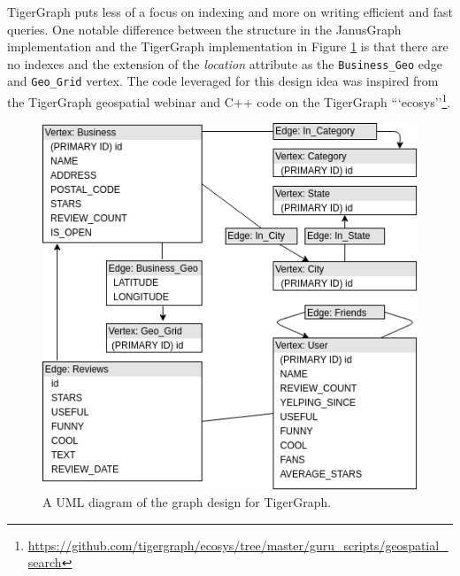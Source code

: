 TigerGraph puts less of a focus on indexing and more on writing efficient and fast queries. One notable difference between the structure in the JanusGraph implementation and the TigerGraph implementation in Figure \ref{fig:tigergraph-design} is that there are no indexes and the extension of the \emph{location} attribute as the \texttt{Business\_Geo} edge and \texttt{Geo\_Grid} vertex. The code leveraged for this design idea was inspired from the TigerGraph geospatial webinar \cite{graphgurus} and C++ code on the TigerGraph ```ecosys''\footnote{\url{https://github.com/tigergraph/ecosys/tree/master/guru\_scripts/geospatial\_search}}.

\begin{figure}[h!]
    \centering
    \includegraphics[width=12cm]{img/tigergraph-design.png}
    \caption{A UML diagram of the graph design for TigerGraph.}
    \label{fig:tigergraph-design}
\end{figure}


